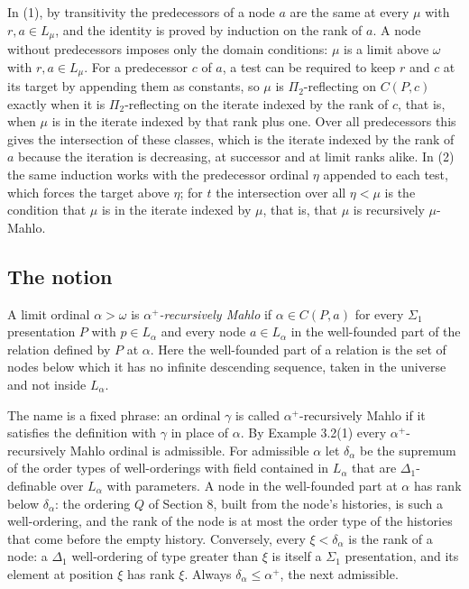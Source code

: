 \documentclass[11pt]{article}
\begin{document}
In (1), by transitivity the predecessors of a node $a$ are the same at every $\mu$ with $r, a \in L_{\mu}$, and the
identity is proved by induction on the rank of $a$. A node without predecessors imposes only the domain conditions:
$\mu$ is a limit above $\omega$ with $r, a \in L_{\mu}$. For a predecessor $c$ of $a$, a test can be required to keep
$r$ and $c$ at its target by appending them as constants, so $\mu$ is $\Pi_2$-reflecting on $C(P, c)$ exactly when it
is $\Pi_2$-reflecting on the iterate indexed by the rank of $c$, that is, when $\mu$ is in the iterate indexed by
that rank plus one. Over all predecessors this gives the intersection of these classes, which is the iterate indexed
by the rank of $a$ because the iteration is decreasing, at successor and at limit ranks alike. In (2) the same
induction works with the predecessor ordinal $\eta$ appended to each test, which forces the target above $\eta$; for
$t$ the intersection over all $\eta < \mu$ is the condition that $\mu$ is in the iterate indexed by $\mu$, that is,
that $\mu$ is recursively $\mu$-Mahlo.

\subsection{The notion}

\begin{statement} A limit ordinal $\alpha > \omega$ is \emph{$\alpha^+$-recursively Mahlo} if $\alpha \in C(P, a)$ for every $\Sigma_1$ presentation $P$ with $p \in L_{\alpha}$ and every node
$a \in L_{\alpha}$ in the well-founded part of the relation defined by $P$ at $\alpha$. Here the well-founded part of
a relation is the set of nodes below which it has no infinite descending sequence, taken in the universe and not
inside $L_{\alpha}$.
\end{statement}

The name is a fixed phrase: an ordinal $\gamma$ is called $\alpha^+$-recursively Mahlo if it satisfies the
definition with $\gamma$ in place of $\alpha$. By Example 3.2(1) every $\alpha^+$-recursively Mahlo ordinal is admissible. For admissible $\alpha$ let $\delta_{\alpha}$ be the supremum
of the order types of well-orderings with field contained in $L_{\alpha}$ that are $\Delta_1$-definable over
$L_{\alpha}$ with parameters. A node in the well-founded part at $\alpha$ has rank below $\delta_{\alpha}$: the ordering
$Q$ of Section 8, built from the node's histories, is such a well-ordering, and the rank of the node is at most the
order type of the histories that come before the empty history. Conversely, every $\xi < \delta_{\alpha}$ is the rank
of a node: a $\Delta_1$ well-ordering of type greater than $\xi$ is itself a $\Sigma_1$ presentation, and its element
at position $\xi$ has rank $\xi$. Always $\delta_{\alpha} \le \alpha^+$, the next admissible.
\end{document}
